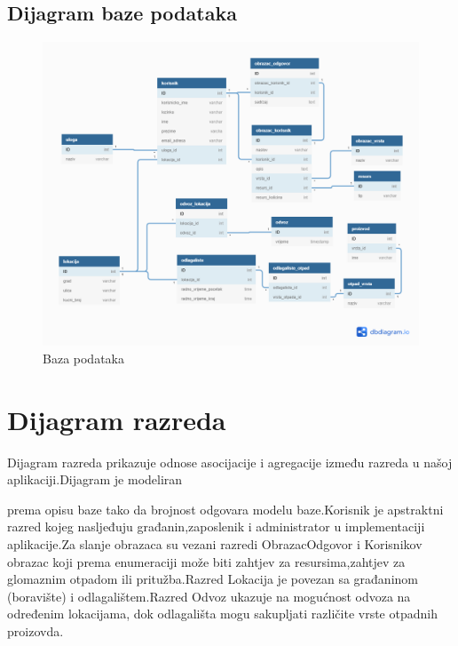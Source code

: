 			\subsection{Dijagram baze podataka}
				
				\begin{figure}[H]
					\includegraphics[width=\textwidth]{slike/baza_podataka.png}
					
					\caption{Baza podataka}
					\label{fig:baza_podataka}
				\end{figure}
			
			\eject
		\clearpage	
			
		\section{Dijagram razreda}
		Dijagram razreda prikazuje odnose asocijacije i agregacije između razreda u našoj aplikaciji.Dijagram je modeliran

		prema opisu baze tako da brojnost odgovara modelu baze.Korisnik je apstraktni razred kojeg nasljeđuju građanin,zaposlenik i administrator u implementaciji aplikacije.Za slanje obrazaca su vezani razredi ObrazacOdgovor i Korisnikov obrazac koji prema enumeraciji može biti zahtjev za resursima,zahtjev za glomaznim otpadom ili pritužba.Razred Lokacija je povezan sa građaninom (boravište) i odlagalištem.Razred Odvoz ukazuje na mogućnost odvoza na određenim lokacijama, dok odlagališta mogu sakupljati različite vrste otpadnih proizovda.

